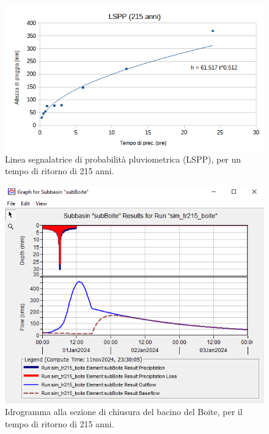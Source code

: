 \begin{figure}[htb] \centering
\includegraphics[scale=0.6]{immagini/LSPP_215.png}
\caption{Linea segnalatrice di probabilità pluviometrica (LSPP), per un tempo di ritorno di 215 anni.}
\label{figure:LSPP_215}    
\end{figure}

\begin{figure}[htb] \centering
\includegraphics[scale=0.6]{immagini/boite_215.PNG}
\caption{Idrogramma alla sezione di chiusura del bacino del Boite, per il tempo di ritorno di 215 anni.}
\label{figure:boite_215}    
\end{figure}

